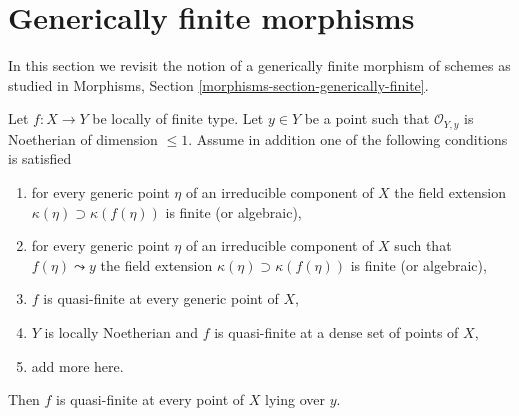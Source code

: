 \section{Generically finite morphisms}
\label{section-generically-finite}

\noindent
In this section we revisit the notion of a generically finite
morphism of schemes as studied in
Morphisms, Section \ref{morphisms-section-generically-finite}.

\begin{lemma}
\label{lemma-quasi-finite-in-codim-1}
Let $f : X \to Y$ be locally of finite type. Let $y \in Y$ be a point
such that $\mathcal{O}_{Y, y}$ is Noetherian of dimension $\leq 1$.
Assume in addition one of the following conditions is satisfied
\begin{enumerate}
\item for every generic point $\eta$ of an irreducible component
of $X$ the field extension $\kappa(\eta) \supset \kappa(f(\eta))$
is finite (or algebraic),
\item for every generic point $\eta$ of an irreducible component
of $X$ such that $f(\eta) \leadsto y$ the field extension
$\kappa(\eta) \supset \kappa(f(\eta))$ is finite (or algebraic),
\item $f$ is quasi-finite at every generic point of $X$,
\item $Y$ is locally Noetherian and $f$
is quasi-finite at a dense set of points of $X$,
\item add more here.
\end{enumerate}
Then $f$ is quasi-finite at every point of $X$ lying over $y$.
\end{lemma}

